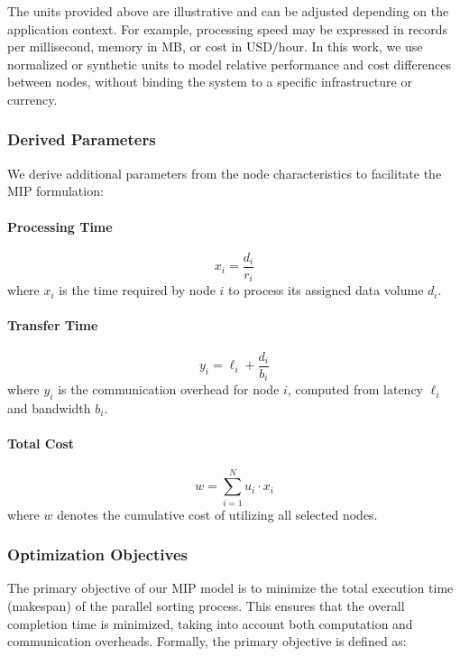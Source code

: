 \documentclass[]{interact}
\theoremstyle{plain}
\theoremstyle{definition}
\theoremstyle{remark}
\begin{document}
The units provided above are illustrative and can be adjusted depending on the application context. For example, processing speed may be expressed in records per millisecond, memory in MB, or cost in USD/hour. In this work, we use normalized or synthetic units to model relative performance and cost differences between nodes, without binding the system to a specific infrastructure or currency.

\subsubsection{Derived Parameters}

We derive additional parameters from the node characteristics to facilitate the MIP formulation:

\paragraph{Processing Time}
\begin{equation}
    x_i = \frac{d_i}{r_i}
\end{equation}
where $x_i$ is the time required by node $i$ to process its assigned data volume $d_i$.

\paragraph{Transfer Time}
\begin{equation}
    y_i = \ell_i + \frac{d_i}{b_i}
\end{equation}
where $y_i$ is the communication overhead for node $i$, computed from latency $\ell_i$ and bandwidth $b_i$.

\paragraph{Total Cost}
\begin{equation}
    w = \sum_{i=1}^N u_i \cdot x_i
\end{equation}
where $w$ denotes the cumulative cost of utilizing all selected nodes.

\subsubsection{Optimization Objectives}

The primary objective of our MIP model is to minimize the total execution time (makespan) of the parallel sorting process. This ensures that the overall completion time is minimized, taking into account both computation and communication overheads. Formally, the primary objective is defined as:
\end{document}
